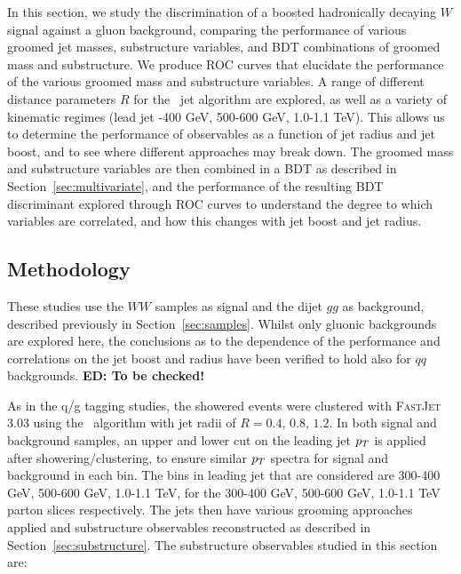 In this section, we study the discrimination of a boosted hadronically decaying $W$ signal against a gluon
background, comparing the performance of various groomed jet
masses, substructure variables, and BDT combinations of groomed mass
and substructure. We produce ROC
curves that elucidate the performance of the various groomed mass and
substructure variables. A
range of different distance parameters $R$ for the \antikt~jet
algorithm are explored, as well as a variety of kinematic regimes
(lead jet -400 GeV, 500-600 GeV, 1.0-1.1 TeV). This allows us to determine the
performance of observables as a function of jet radius and jet boost, and to see
where different approaches may break down. The groomed
mass and substructure variables are then combined in a BDT as described in Section~\ref{sec:multivariate}, and the performance of the resulting BDT discriminant
explored through ROC curves to understand the degree to which
variables are correlated, and how
this changes with jet boost and jet radius. 

\subsection{Methodology}

These studies use the $WW$ samples as signal and the dijet $gg$ as background, described previously in Section~\ref{sec:samples}. Whilst only gluonic backgrounds
are explored here, the conclusions as to the dependence of the
performance and correlations on the jet boost and radius have been
verified to hold also for $qq$ backgrounds. {\bf ED: To be checked!}

As in the q/g tagging studies, the showered events were clustered with \textsc{FastJet}
3.03 using
the \antikt~algorithm with jet radii of $R = 0.4,\, 0.8,\, 1.2$. In
both signal and background samples, an upper and lower cut on
the leading jet $p_T$ is applied after showering/clustering, to ensure
similar $p_T$ spectra for signal and background in each \pt bin. The bins
in leading jet \pt that are considered are 300-400 GeV, 500-600 GeV,
1.0-1.1 TeV, for the 300-400 GeV, 500-600 GeV,
1.0-1.1 TeV parton \pt slices respectively. The jets then have various
grooming approaches applied and substructure observables
reconstructed as described in
Section~\ref{sec:substructure}. The substructure observables
studied in this section are: 


